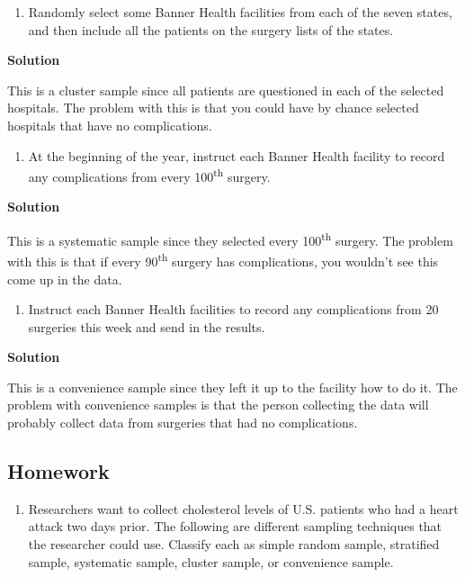 \documentclass[]{book}
\providecommand{\tightlist}{%
  \setlength{\itemsep}{0pt}\setlength{\parskip}{0pt}}
\begin{document}
\begin{enumerate}
\def\labelenumi{\alph{enumi}.}
\setcounter{enumi}{2}
\tightlist
\item
  Randomly select some Banner Health facilities from each of the seven
  states, and then include all the patients on the surgery lists of
  the states.
\end{enumerate}

\textbf{Solution}

This is a cluster sample since all patients are questioned in each
of the selected hospitals. The problem with this is that you could
have by chance selected hospitals that have no complications.

\begin{enumerate}
\def\labelenumi{\alph{enumi}.}
\setcounter{enumi}{3}
\tightlist
\item
  At the beginning of the year, instruct each Banner Health facility
  to record any complications from every 100\textsuperscript{th} surgery.
\end{enumerate}

\textbf{Solution}

This is a systematic sample since they selected every 100\textsuperscript{th}
surgery. The problem with this is that if every 90\textsuperscript{th} surgery has
complications, you wouldn't see this come up in the data.

\begin{enumerate}
\def\labelenumi{\alph{enumi}.}
\setcounter{enumi}{4}
\tightlist
\item
  Instruct each Banner Health facilities to record any complications
  from 20 surgeries this week and send in the results.
\end{enumerate}

\textbf{Solution}

This is a convenience sample since they left it up to the facility
how to do it. The problem with convenience samples is that the
person collecting the data will probably collect data from surgeries
that had no complications.

\hypertarget{homework-1}{%
\subsection{Homework}\label{homework-1}}

\begin{enumerate}
\def\labelenumi{\arabic{enumi}.}
\tightlist
\item
  Researchers want to collect cholesterol levels of U.S. patients who
  had a heart attack two days prior. The following are different
  sampling techniques that the researcher could use. Classify each as
  simple random sample, stratified sample, systematic sample, cluster
  sample, or convenience sample.
\end{enumerate}
\end{document}
